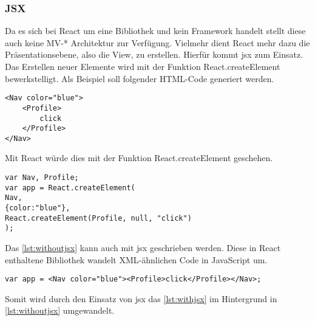 \subsubsection{JSX}
Da es sich bei React um eine Bibliothek und kein Framework handelt stellt diese auch keine MV-* Architektur zur Verfügung. Vielmehr dient React mehr dazu die Präsentationsebene, also die View, zu erstellen. Hierfür kommt \ac{jsx} zum Einsatz.\\
Das Erstellen neuer Elemente wird mit der Funktion React.createElement bewerkstelligt. Als Beispiel soll folgender HTML-Code generiert werden.

\begin{lstlisting}[style=htmlcssjs, caption=Zu generierender HTML-Code, label=lst:reacthtml]
<Nav color="blue">
	<Profile>
		click
	</Profile>
</Nav>
\end{lstlisting}

Mit React würde dies mit der Funktion React.createElement geschehen.

\begin{lstlisting}[style=htmlcssjs, caption=Generierung von HTML in React, label=lst:withoutjsx]
var Nav, Profile;
var app = React.createElement(
Nav,
{color:"blue"},
React.createElement(Profile, null, "click")
);
\end{lstlisting}

Das \autoref{lst:withoutjsx} kann auch mit \ac{jsx} geschrieben werden. Diese in React enthaltene Bibliothek wandelt XML-ähnlichen Code in JavaScript um.

\begin{lstlisting}[style=htmlcssjs, caption=Generierung von HTML mit JSX, label=lst:withjsx]
var app = <Nav color="blue"><Profile>click</Profile></Nav>;
\end{lstlisting}

Somit wird durch den Einsatz von \ac{jsx} das \autoref{lst:withjsx} im Hintergrund in \autoref{lst:withoutjsx} umgewandelt.